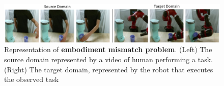 \begin{figure}[tb]
    
    \includegraphics[width=\textwidth]{figures/images/embodiment_mismatch/embo.png}
    \caption{Representation of \textbf{embodiment mismatch problem}. (Left) The source domain
    represented by a video of human performing a task. (Right) The target domain, represented
    by the robot that executes the observed task}
    \label{fig:embo_mismatch}
    
\end{figure}
